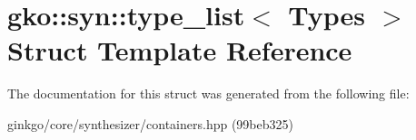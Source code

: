 \hypertarget{structgko_1_1syn_1_1type__list}{}\section{gko\+:\+:syn\+:\+:type\+\_\+list$<$ Types $>$ Struct Template Reference}
\label{structgko_1_1syn_1_1type__list}


The documentation for this struct was generated from the following file\+:\begin{DoxyCompactItemize}
\item 
ginkgo/core/synthesizer/containers.\+hpp (99beb325)\end{DoxyCompactItemize}
